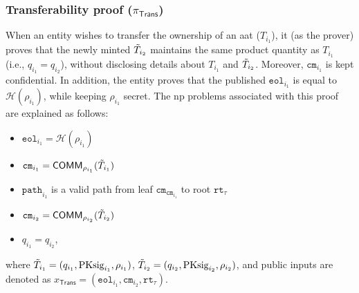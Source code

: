 \subsubsection{Transferability proof ($\pi_\textsf{Trans}$)}

When an entity wishes to transfer the ownership of an \gls{aat} ($T_{i_1}$), it (as the prover) proves that the newly minted $\Tilde{T}_{i_2}$ maintains the same product quantity as $T_{i_1}$ (i.e., $q_{i_1} = q_{i_2}$), without disclosing details about $T_{i_1}$ and $\Tilde{T}_{i_2}$. Moreover,  $\texttt{cm}_{i_1}$ is kept confidential. In addition, the entity proves that the published $\texttt{eol}_{i_1}$ is equal to $\mathcal{H}(\rho_{i_1})$, while keeping $\rho_{i_1}$ secret. The \gls{np} problems associated with this proof are explained as follows:

\begin{itemize}
	\item $\texttt{eol}_{i_1} = \mathcal{H}(\rho_{i_1} )$
	\item $\texttt{cm}_{i_1} = \mathsf{COMM}_{\rho_{i_1}}(\Tilde{T}_{i_1})$
	\item $\texttt{path}_{{i_1}}$ is a valid path from leaf  $\texttt{cm}_{\texttt{cm}_{i_1}}$ to root $\texttt{rt}_\tau$
	\item $\texttt{cm}_{i_2} = \mathsf{COMM}_{\rho_{i_2}}(\Tilde{T}_{i_2})$
	\item $q_{i_1} = q_{i_2} $,
\end{itemize}
where  $\Tilde{T}_{i_1} = (q_{i_1}, \text{PKsig}_{i_1}, \rho_{i_1})$, $\Tilde{T}_{i_2} = (q_{i_2}, \text{PKsig}_{i_2}, \rho_{i_2})$, and public inputs are denoted as $x_\mathsf{Trans} = (\texttt{eol}_{i_1}, \texttt{cm}_{i_2}, \texttt{rt}_\tau)$.

